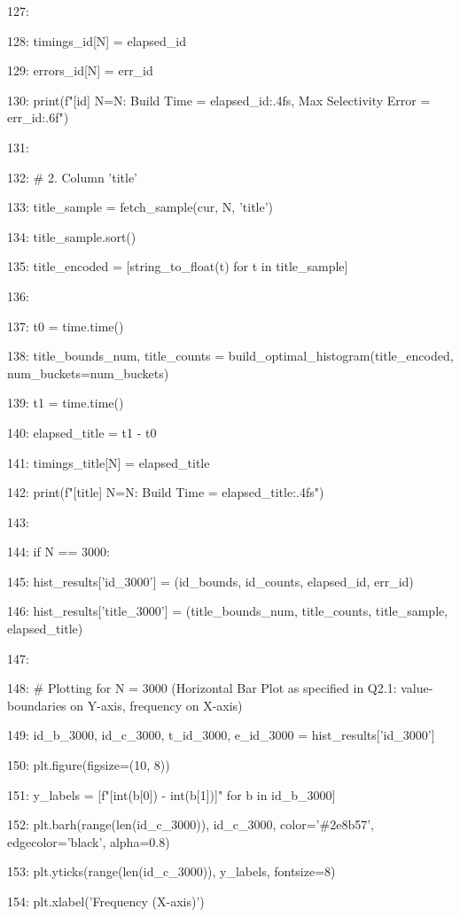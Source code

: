 \documentclass[11pt,a4paper]{article}
\begin{document}
{127:

128:         timings\_id[N] = elapsed\_id

129:         errors\_id[N] = err\_id

130:         print(f"[id] N={N}: Build Time = {elapsed\_id:.4f}s, Max Selectivity Error = {err\_id:.6f}")

131:

132:         \# 2. Column 'title'

133:         title\_sample = fetch\_sample(cur, N, 'title')

134:         title\_sample.sort()

135:         title\_encoded = [string\_to\_float(t) for t in title\_sample]

136:

137:         t0 = time.time()

138:         title\_bounds\_num, title\_counts = build\_optimal\_histogram(title\_encoded, num\_buckets=num\_buckets)

139:         t1 = time.time()

140:         elapsed\_title = t1 - t0

141:         timings\_title[N] = elapsed\_title

142:         print(f"[title] N={N}: Build Time = {elapsed\_title:.4f}s")

143:

144:         if N == 3000:

145:             hist\_results['id\_3000'] = (id\_bounds, id\_counts, elapsed\_id, err\_id)

146:             hist\_results['title\_3000'] = (title\_bounds\_num, title\_counts, title\_sample, elapsed\_title)

147:

148:     \# Plotting for N = 3000 (Horizontal Bar Plot as specified in Q2.1: value-boundaries on Y-axis, frequency on X-axis)

149:     id\_b\_3000, id\_c\_3000, t\_id\_3000, e\_id\_3000 = hist\_results['id\_3000']

150:     plt.figure(figsize=(10, 8))

151:     y\_labels = [f"[{int(b[0])} - {int(b[1])}]" for b in id\_b\_3000]

152:     plt.barh(range(len(id\_c\_3000)), id\_c\_3000, color='\#2e8b57', edgecolor='black', alpha=0.8)

153:     plt.yticks(range(len(id\_c\_3000)), y\_labels, fontsize=8)

154:     plt.xlabel('Frequency (X-axis)')

}
\end{document}
